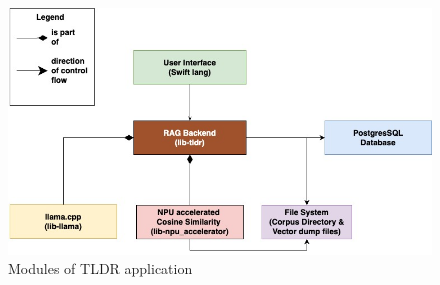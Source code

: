 \begin{figure}[H]
    \centering
    \includegraphics[width=1.0\linewidth]{images/tldr-app-modules.jpg}
    \caption{Modules of TLDR application}
    \label{fig:tldr_modules}
\end{figure}


